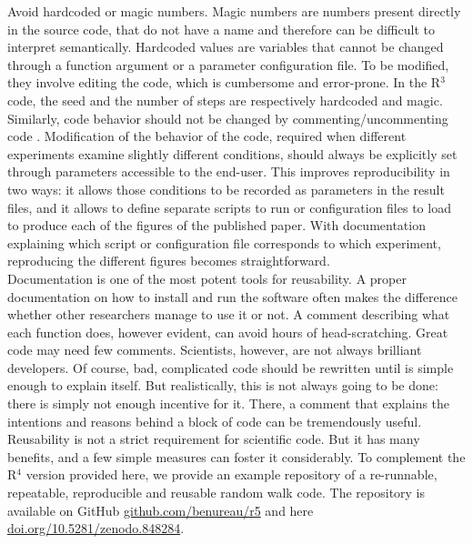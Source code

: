 \documentclass[a4paper,11pt]{article}
\begin{document}
Avoid hardcoded or magic numbers. Magic numbers are numbers present directly in the source code, that do not have a name and therefore can be difficult to interpret semantically. Hardcoded values are variables that cannot be changed through a function argument or a parameter configuration file. To be modified, they involve editing the code, which is cumbersome and error-prone. In the R$^3$ code, the seed and the number of steps are respectively hardcoded and magic.\\

Similarly, code behavior should not be changed by commenting/uncommenting code \citep{Wilson:2017}. Modification of the behavior of the code, required when different experiments examine slightly different conditions, should always be explicitly set through parameters accessible to the end-user. This improves reproducibility in two ways: it allows those conditions to be recorded as parameters in the result files, and it allows to define separate scripts to run or configuration files to load to produce each of the figures of the published paper. With documentation explaining which script or configuration file corresponds to which experiment, reproducing the different figures becomes straightforward.\\

Documentation is one of the most potent tools for reusability. A proper documentation on how to install and run the software often makes the difference whether other researchers manage to use it or not. A comment describing what each function does, however evident, can avoid hours of head-scratching. Great code may need few comments. Scientists, however, are not always brilliant developers. Of course, bad, complicated code should be rewritten until is simple enough to explain itself. But realistically, this is not always going to be done: there is simply not enough incentive for it. There, a comment that explains the intentions and reasons behind a block of code can be tremendously useful.\\

Reusability is not a strict requirement for scientific code. But it has many benefits, and a few simple measures can foster it considerably. To complement the R$^4$ version provided here, we provide an example repository of a re-runnable, repeatable, reproducible and reusable random walk code. The repository is available on GitHub \href{https://github.com/benureau/r5}{github.com/benureau/r5} and here \href{https://doi.org/10.5281/zenodo.848284}{doi.org/10.5281/zenodo.848284}.
\end{document}
